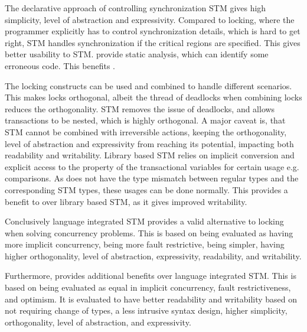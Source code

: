 The declarative approach of controlling synchronization \ac{STM} gives high simplicity, level of abstraction and expressivity. Compared to locking, where the programmer explicitly has to control synchronization details, which is hard to get right, \ac{STM} handles synchronization if the critical regions are specified. This gives better usability to \ac{STM}. \stmname provide static analysis, which can identify some erroneous code. This benefits \stmname.

The locking constructs can be used and combined to handle different scenarios. This makes locks orthogonal, albeit the thread of deadlocks when combining locks reduces the orthogonality. \ac{STM} removes the issue of deadlocks, and allows transactions to be nested, which is highly orthogonal. A major caveat is, that \ac{STM} cannot be combined with irreversible actions, keeping the orthogonality, level of abstraction and expressivity from reaching its potential, impacting both readability and writability. Library based \ac{STM} relies on implicit conversion and explicit access to the  property of the transactional variables for certain usage e.g. comparisons. As \stmname does not have the type mismatch between regular types and the corresponding \ac{STM} types, these usages can be done normally. This provides a benefit to \stmname over library based \ac{STM}, as it gives improved writability.


Conclusively language integrated \ac{STM} provides a valid alternative to locking when solving concurrency problems. This is based on being evaluated as having more implicit concurrency, being more fault restrictive, being simpler, having higher orthogonality, level of abstraction, expressivity, readability, and writability.

Furthermore, \stmname provides additional benefits over language integrated \ac{STM}. This is based on being evaluated as equal in implicit concurrency, fault restrictiveness, and optimism. It is evaluated to have better readability and writability based on not requiring change of types, a less intrusive syntax design, higher simplicity, orthogonality, level of abstraction, and expressivity.







\worksheetend